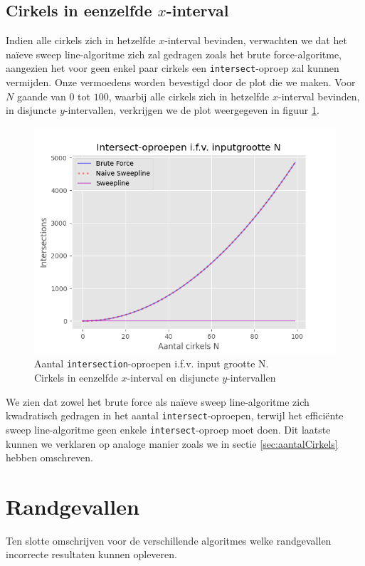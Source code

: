 \documentclass[12pt]{article}
\begin{document}
\subsection{Cirkels in eenzelfde $x$-interval}
Indien alle cirkels zich in hetzelfde $x$-interval bevinden, verwachten we dat het naïeve sweep line-algoritme zich zal gedragen zoals het brute force-algoritme, aangezien het voor geen enkel paar cirkels een \texttt{intersect}-oproep zal kunnen vermijden. Onze vermoedens worden bevestigd door de plot die we maken. Voor $N$ gaande van $0$ tot $100$, waarbij alle cirkels zich in hetzelfde $x$-interval bevinden, in disjuncte $y$-intervallen, verkrijgen we de plot weergegeven in figuur \ref{fig:CirkelsStacked}.

\begin{figure}[H]
	\centering
	\includegraphics[width=\linewidth]{../plots/IntersectionsCirkelsStacked.png}
	\caption{Aantal \texttt{intersection}-oproepen i.f.v. input grootte N.\\ Cirkels in eenzelfde $x$-interval en disjuncte $y$-intervallen}
	\label{fig:CirkelsStacked}
\end{figure}

We zien dat zowel het brute force als naïeve sweep line-algoritme zich kwadratisch gedragen in het aantal \texttt{intersect}-oproepen, terwijl het efficiënte sweep line-algoritme geen enkele \texttt{intersect}-oproep moet doen. Dit laatste kunnen we verklaren op analoge manier zoals we in sectie \ref{sec:aantalCirkels} hebben omschreven.

\section{Randgevallen}
Ten slotte omschrijven voor de verschillende algoritmes welke randgevallen incorrecte resultaten kunnen opleveren.
\end{document}
